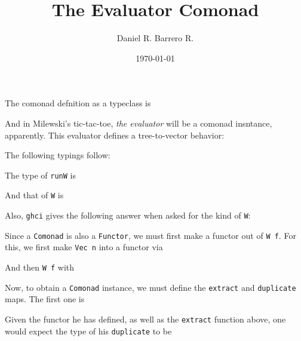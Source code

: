 \documentclass{amsart}
\title{The Evaluator Comonad}
\author{Daniel R. Barrero R.}
\date{\today}
\begin{document}
\maketitle

\section{}

The comonad defnition as a typeclass is



And in Milewski's tic-tac-toe, \emph{the evaluator} will be a comonad insntance,
apparently. This evaluator defines a tree-to-vector behavior:



The following typings follow:

\bigskip

The type of \texttt{runW} is



And that of \texttt{W} is



Also, \texttt{ghci} gives the following answer when asked for the kind of
\texttt{W}:



Since a \texttt{Comonad} is also a \texttt{Functor}, we must first make a
functor out of \texttt{W f}. For this, we first make \texttt{Vec n} into a
functor via



And then \texttt{W f} with



Now, to obtain a \texttt{Comonad} instance, we must define the \texttt{extract}
and \texttt{duplicate} maps. The first one is



Given the functor he has defined, as well as the \texttt{extract} function
above, one would expect the type of his \texttt{duplicate} to be
\end{document}
